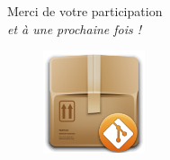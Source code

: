 \documentclass{beamer}
\begin{document}
\begin{frame}
		\begin{center}
 		\Large{Merci de votre participation}\\
 		{\small \textit{et à une prochaine fois !}}
	\end{center}

	\begin{figure}
		\centering
		\includegraphics[height=3cm]{img/git_repo}
	\end{figure}
\end{frame}
\end{document}
